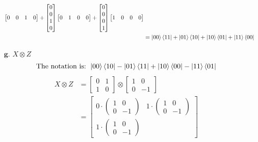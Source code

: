 \documentclass[11pt]{article}
\begin{document}
\begin{enumerate}
\begin{align*}
                       \begin{bmatrix}0 & 0 & 1 & 0\end{bmatrix} +
                       \begin{bmatrix}0 \\ 0 \\ 1 \\ 0\end{bmatrix}
                       \begin{bmatrix}0 & 1 & 0 & 0\end{bmatrix} +
                       \begin{bmatrix}0 \\ 0 \\ 0 \\ 1\end{bmatrix}
                       \begin{bmatrix}1 & 0 & 0 & 0\end{bmatrix} \\
                    &= \ket{00}\bra{11} + \ket{01}\bra{10} + \ket{10}\bra{01} + \ket{11}\bra{00} 
    \end{align*}
\newpage
    \item[$\textbf{g.}$] $X \otimes Z$
    $$\text{The notation is: } 
    \ket{00}\bra{10} - \ket{01}\bra{11} + \ket{10}\bra{00} - \ket{11}\bra{01} $$
    \begin{align*}
        X \otimes Z &= 
                    \begin{bmatrix}0 & 1 \\ 1 & 0 \end{bmatrix}
                        \otimes
                    \begin{bmatrix}1 & 0 \\ 0 & -1 \end{bmatrix} \\
                    &= 
                    \begin{bmatrix}
                        0 \cdot \begin{pmatrix}1 & 0 \\ 0 & -1 \end{pmatrix} 
                    &   1 \cdot \begin{pmatrix}1 & 0 \\ 0 & -1 \end{pmatrix}  \\
                        1 \cdot \begin{pmatrix}1 & 0 \\ 0 & -1 \end{pmatrix} 

\end{bmatrix}
\end{align*}
\end{enumerate}
\end{document}
